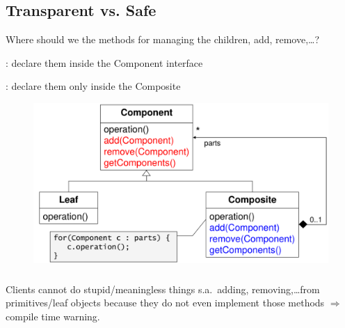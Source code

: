 \subsection*{Transparent vs. Safe}
\label{subsubsec:TransparentVsSafe}
\begin{sectionbox}[Question]\nospacing
  Where should we  the methods for managing the children, add, remove,\ldots?
  \begin{itemizenosep}
      \item {}: declare them inside the Component
    interface
      \item {}: declare them only inside the Composite
  \end{itemizenosep}
  \begin{figure}[H]
    \centering
    \includegraphics[width=1.0\textwidth]{figures/transSafe.png}
  \end{figure}
\end{sectionbox}
\subsubsection{}
\begin{sectionbox}\nospacing
 Clients cannot do stupid/meaningless things s.a.\ adding, removing,\ldots from
 primitives/leaf objects because they do not even implement those methods
 $\Rightarrow$ compile time warning.
\end{sectionbox}
